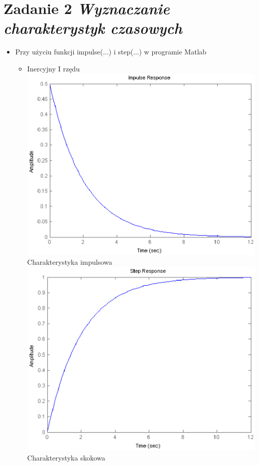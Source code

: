 \documentclass[a4paper,10pt]{article}
\begin{document}
\section{Zadanie 2 \textit{\small Wyznaczanie charakterystyk czasowych}}\label{sec:zad2}

\begin{itemize}
\item Przy użyciu funkcji impulse(...) i step(...) w programie Matlab
\begin{itemize}
\item Inercyjny I rzędu
\newline \includegraphics[scale=0.9]{CW1-inercyjny1-impuls.eps}\newline Charakterystyka impulsowa
\newline \includegraphics[scale=0.9]{CW1-inercyjny1-skok.eps}\newline Charakterystyka skokowa

\end{itemize}
\end{itemize}
\end{document}
